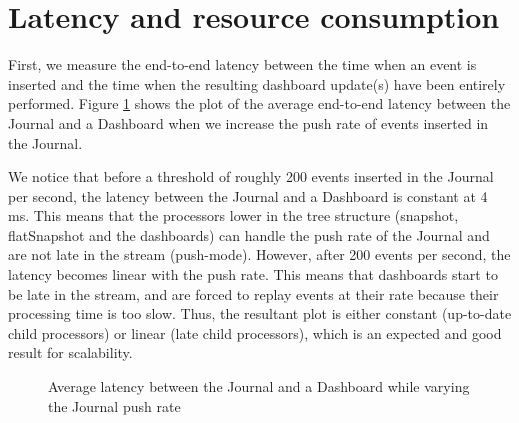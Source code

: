 \section{Latency and resource consumption}

First, we measure the end-to-end latency between the time when an event is inserted and the time when the resulting dashboard update(s) have been entirely performed. Figure \ref{fig:latencyplot} shows the plot of the average end-to-end latency between the Journal and a Dashboard when we increase the push rate of events inserted in the Journal.

We notice that before a threshold of roughly 200 events inserted in the Journal per second, the latency between the Journal and a Dashboard is constant at 4 ms. This means that the processors lower in the tree structure (snapshot, flatSnapshot and the dashboards) can handle the push rate of the Journal and are not late in the stream (push-mode).
However, after 200 events per second, the latency becomes linear with the push rate. This means that dashboards start to be late in the stream, and are forced to replay events at their rate because their processing time is too slow. Thus, the resultant plot is either constant (up-to-date child processors) or linear (late child processors), which is an expected and good result for scalability.
\\

\begin{figure}
  \begin{center} 
    \caption{Average latency between the Journal and a Dashboard while varying the Journal push rate}
    \label{fig:latencyplot}
  \end{center}
\end{figure}

